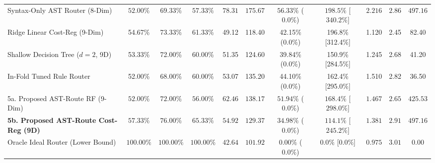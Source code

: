 \documentclass[10pt,a4paper]{article}
\begin{document}
\begin{table}[!t]
\begin{tabular}{@{}lcccccccccc@{}}
Syntax-Only AST Router (8-Dim) & $52.00\%$ & $69.33\%$ & $57.33\%$ & $78.31$ & $175.67$ & $56.33\%$ ($0.0\%$) & $198.5\%$ [$340.2\%$] & $2.216$ & $2.86$ & $497.16$ \\
Ridge Linear Cost-Reg (9-Dim) & 54.67\% & 73.33\% & 61.33\% & 49.12 & 118.40 & 42.15\% (0.0\%) & 196.8\% [312.4\%] & 1.120 & 2.45 & 82.40 \\
Shallow Decision Tree ($d=2$, 9D) & 53.33\% & 72.00\% & 60.00\% & 51.35 & 124.60 & 39.84\% (0.0\%) & 150.9\% [284.5\%] & 1.245 & 2.68 & 41.20 \\
In-Fold Tuned Rule Router & 52.00\% & 68.00\% & 60.00\% & 53.07 & 135.20 & 44.10\% (0.0\%) & 162.4\% [295.0\%] & 1.510 & 2.82 & 36.50 \\
5a. Proposed AST-Route RF (9-Dim) & $52.00\%$ & $72.00\%$ & $56.00\%$ & $62.46$ & $138.17$ & $51.94\%$ ($0.0\%$) & $168.4\%$ [$298.0\%$] & $1.467$ & $2.65$ & $425.53$ \\
\textbf{5b. Proposed AST-Route Cost-Reg (9D)} & $\mathbf{57.33\%}$ & $\mathbf{76.00\%}$ & $\mathbf{65.33\%}$ & $\mathbf{54.92}$ & $\mathbf{129.37}$ & $\mathbf{34.98\%}$ ($\mathbf{0.0\%}$) & $\mathbf{114.1\%}$ [$\mathbf{245.2\%}$] & $\mathbf{1.381}$ & $\mathbf{2.91}$ & $\mathbf{497.16}$ \\
Oracle Ideal Router (Lower Bound) & $100.00\%$ & $100.00\%$ & $100.00\%$ & $42.64$ & $101.92$ & $0.00\%$ ($0.0\%$) & $0.0\%$ [$0.0\%$] & $0.975$ & $3.01$ & $0.00$ \\
\bottomrule

\end{tabular}
\end{table}
\end{document}
